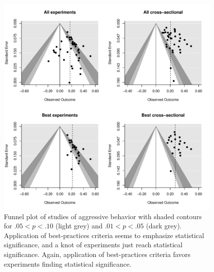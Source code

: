 \documentclass[man]{apa6}
\begin{document}
\begin{figure}
	\includegraphics[width = \textwidth, keepaspectratio]{funnels-0_AggBeh.pdf}
	\caption{Funnel plot of studies of aggressive behavior with shaded contours for $.05 < p < .10$ (light grey) and $.01 < p < .05$ (dark grey). Application of best-practices criteria seems to emphasize statistical significance, and a knot of experiments just reach statistical significance. Again, application of best-practices criteria favors experiments finding statistical significance.}
	\label{funnel-aggbeh}
\end{figure}
\end{document}
